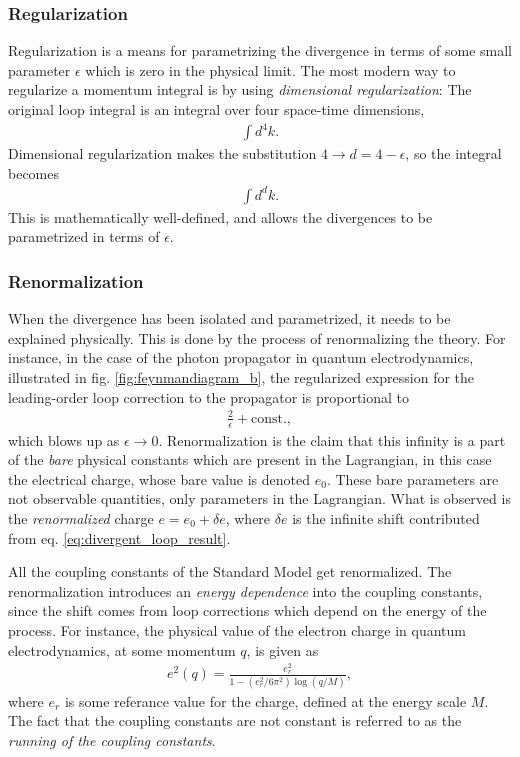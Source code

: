 \documentclass[twoside,english]{uiofysmaster}
\begin{document}
\subsubsection{Regularization}
Regularization is a means for parametrizing the divergence in terms of some small parameter $\epsilon$ which is zero in the physical limit. The most modern way to regularize a momentum integral is by using {\it dimensional regularization}: The original loop integral is an integral over four space-time dimensions, 
\begin{align}
	\int d^4 k.
\end{align}
Dimensional regularization makes the substitution $4 \to d = 4-\epsilon$, so the integral becomes
\begin{align}
	\int d^d k.
\end{align}
This is mathematically well-defined, and allows the divergences to be parametrized in terms of $\epsilon$.
\subsubsection{Renormalization}
When the divergence has been isolated and parametrized, it needs to be explained physically. This is done by the process of renormalizing the theory. For instance, in the case of the photon propagator in quantum electrodynamics, illustrated in fig. \ref{fig:feynmandiagram_b}, the regularized expression for the leading-order loop correction to the propagator is proportional to
\begin{align}
	\frac{2}{\epsilon} + \mathrm{const.}, \label{eq:divergent_loop_result}
\end{align}
which blows up as $\epsilon\to 0$. Renormalization is the claim that this infinity is a part of the {\it bare} physical constants which are present in the Lagrangian, in this case the electrical charge, whose bare value is denoted $e_0$. These bare parameters are not observable quantities, only parameters in the Lagrangian. What is observed is the {\it renormalized} charge $e = e_0 + \delta e$, where $\delta e$ is the infinite shift contributed from eq. \eqref{eq:divergent_loop_result}.

All the coupling constants of the Standard Model get renormalized. The renormalization introduces an {\it energy dependence} into the coupling constants, since the shift comes from loop corrections which depend on the energy of the process. For instance, the physical value of the electron charge in quantum electrodynamics, at some momentum $q$, is given as
\begin{align}
	e^2(q) = \frac{e_r^2}{1 - (e_r^2/6\pi^2)\log(q/M)},\label{eq:electron_charge_running}
\end{align}
where $e_r$ is some referance value for the charge, defined at the energy scale $M$. The fact that the coupling constants are not constant is referred to as the {\it running of the coupling constants}.
\end{document}
